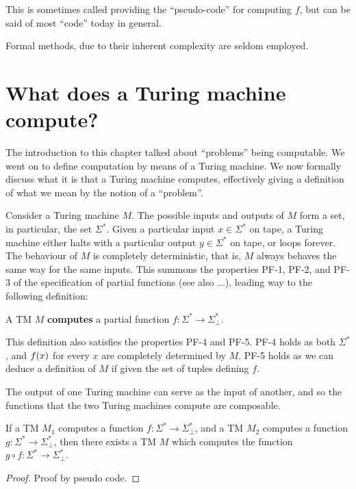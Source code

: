 This is sometimes called providing the ``pseudo-code'' for computing $f$, but can be said
of most ``code'' today in general.

Formal methods, due to their inherent complexity are seldom employed.

\section{What does a Turing machine compute?}\label{sec:background-what-tm-computes}

The introduction to this chapter talked about ``problems'' being computable. We
went on to define computation by means of a Turing machine. We now formally
discuss what it is that a Turing machine computes, effectively giving a
definition of what we mean by the notion of a ``problem''.

Consider a Turing machine $M$. The possible inputs and outputs of $M$ form a
set, in particular, the set $\Sigma^*$. Given a particular input $x\in\Sigma^*$
on tape, a Turing machine either halts with a particular output $y\in\Sigma^*$
on tape, or loops forever. The behaviour of $M$ is completely deterministic,
that is, $M$ always behaves the same way for the same inputs. This summons the
properties PF-1, PF-2, and PF-3 of the specification of partial functions (see
also ...), leading way to the following definition:

\begin{definition}\label{def:tm-computes-sigma} A TM $M$ \textbf{computes} a
partial function $f:\Sigma^*\rightarrow \Sigma^*_\bot$. \end{definition}

This definition also satisfies the properties PF-4 and PF-5. PF-4 holds as both
$\Sigma^*$, and $f\mathopen{}\left({x}\right)\mathclose{}$ for every $x$ are completely determined by $M$. PF-5
holds as we can deduce a definition of $M$ if given the set of tuples defining
$f$.

The output of one Turing machine can serve as the input of another, and so the
functions that the two Turing machines compute are composable.

\begin{theorem} If a TM $M_1$ computes a function $f : \Sigma^* \rightarrow
\Sigma^*_\bot$, and a TM $M_2$ computes a function $g : \Sigma^* \rightarrow
\Sigma^*_\bot$, then there exists a TM $M$ which computes the function $g\circ
f : \Sigma^* \rightarrow \Sigma^*_\bot$.\end{theorem}

\begin{proof} Proof by pseudo code. \end{proof}

